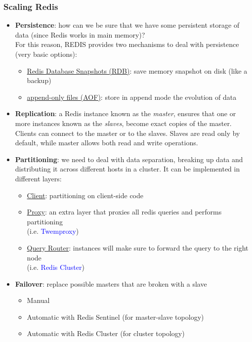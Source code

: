 \documentclass[10pt,a4paper]{article}
\begin{document}
\subsubsection{Scaling Redis}
\begin{itemize}
	\item \textbf{Persistence}: how can we be sure that we have some persistent storage of data (since Redis works in main memory)? \\ For this reason, REDIS provides two mechanisms to deal with persistence (very basic options):
	\begin{itemize}
		\item \uline{Redis Database Snapshots (RDB)}: save memory snapshot on disk (like a backup)
		\item \uline{append-only files (AOF)}: store in append mode the evolution of data
	\end{itemize}
	\item \textbf{Replication}: a Redis instance known as the \textit{master}, ensures that one or more instances known as the \textit{slaves}, become exact copies of the master. Clients can connect to the master or to the slaves. Slaves are read only by default, while master allows both read and write operations.
	\item \textbf{Partitioning}: we need to deal with data separation, breaking up data and distributing it across different hosts in a cluster. It can be implemented in different layers:
	\begin{itemize}
		\item \uline{Client}: partitioning on client-side code
		\item \uline{Proxy}: an extra layer that proxies all redis queries and performs partitioning \\ (i.e. \textcolor{blue}{Twemproxy})
		\item \uline{Query Router}: instances will make sure to forward the query to the right node\\  (i.e. \textcolor{blue}{Redis Cluster})
	\end{itemize}
	\item \textbf{Failover}: replace possible masters that are broken with a slave
	\begin{itemize}
		\item Manual
		\item Automatic with Redis Sentinel (for master-slave topology)
		\item Automatic with Redis Cluster (for cluster topology)
	\end{itemize}
\end{itemize}
\end{document}

